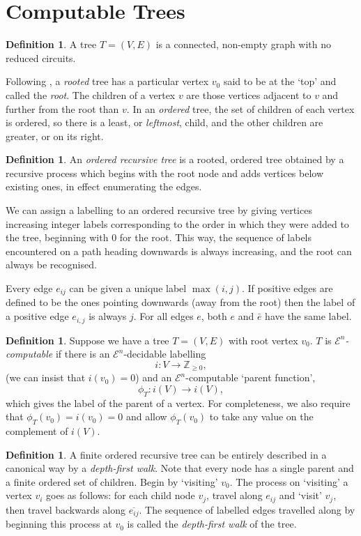 \documentclass[a4paper]{article}
\newcommand{\grz}[1]{$\mathcal{E}^{#1}$}	%
\newcommand{\Zpos}{\mathbb{Z}_{\geq 0}}
\theoremstyle{plain}
\theoremstyle{definition}
\newtheorem{definition}[theorem]{Definition}
\begin{document}
\section{Computable Trees \label{trees}}

\begin{definition}
A tree $T = (V,E)$ is a connected, non-empty graph with no reduced circuits.

Following \cite{Janson_2008}, a {\it rooted} tree has a particular vertex $v_0$ said to be at the `top' and called the {\it root}. The children of a vertex $v$ are those vertices adjacent to $v$ and further from the root than $v$. In an {\it ordered} tree, the set of children of each vertex is ordered, so there is a least, or {\it leftmost}, child, and the other children are greater, or on its right.
\end{definition}

\begin{definition}
An {\it ordered recursive tree} is a rooted, ordered tree obtained by a recursive process which begins with the root node and adds vertices below existing ones, in effect enumerating the edges.
\end{definition}

We can assign a labelling to an ordered recursive tree by giving vertices increasing integer labels corresponding to the order in which they were added to the tree, beginning with $0$ for the root. This way, the sequence of labels encountered on a path heading downwards is always increasing, and the root can always be recognised. 

Every edge $e_{ij}$ can be given a unique label $\max(i,j)$. 
If positive edges are defined to be the ones pointing downwards (away from the root) then the label of a positive edge $e_{i,j}$ is always $j$. For all 
edges $e$, both $e$ and $\bar e$  have the same label.

\begin{definition}
	Suppose we have a tree $T=(V,E)$ with root vertex $v_0$. $T$ is {\it \grz{n}-computable} if there is an \grz{n}-decidable labelling 
	\[i: V \rightarrow \Zpos,\]
(we can insist that $i(v_0) = 0$) and an \grz{n}-computable `parent function',
\[\phi_T:i(V) \rightarrow i(V),\]
which gives the label of the parent of a vertex. For completeness, we also require that $\phi_T(v_0) = i(v_0) = 0$ and allow $\phi_T(v_0)$ to take any value on the complement of $i(V)$.
\end{definition}

\begin{definition}
	A finite ordered recursive tree can be entirely described in a canonical way by a {\it depth-first walk}. Note that every node has a single parent and a finite ordered set of children. Begin by `visiting' $v_0$. The process on `visiting' a vertex $v_i$ goes as follows: for each child node $v_j$, travel along $e_{ij}$ and `visit' $v_j$, then travel backwards along $\overline{e_{ij}}$. The sequence of labelled edges travelled along by beginning this process at $v_0$ is called the {\it depth-first walk} of the tree.
\end{definition}
\end{document}
